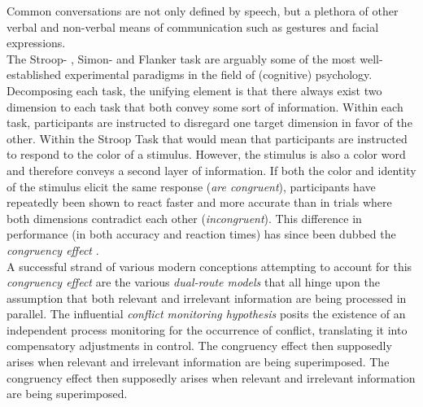 Common conversations are not only defined by speech, but a plethora of other
verbal and non-verbal means of communication such as gestures and facial
expressions.\\
The Stroop- \parencite[][]{stroop_studies_1935}, Simon- \parencite[][]{simon_auditory_1967}
and Flanker task \parencite[][]{eriksen_effects_1974} are arguably some of the
most well-established experimental paradigms in the field of (cognitive)
psychology. Decomposing each task, the unifying element is that there always
exist two dimension to each task that both convey some sort of information.
Within each task, participants are instructed to disregard one target
dimension in favor of the other. Within the Stroop Task that would mean that
participants are instructed to respond to the color of a stimulus. However,
the stimulus is also a color word and therefore conveys a second layer of
information. If both the color and identity of the stimulus elicit the same
response (\textit{are congruent}), participants have repeatedly been shown to
react faster and more accurate than in trials where both dimensions contradict
each other (\textit{incongruent}). This difference in performance (in both
accuracy and reaction times) has since been dubbed the \textit{congruency
	effect} \parencite[][]{botvinick_conflict_2001, botvinick_conflict_2004,
	stroop_studies_1935, simon_auditory_1967, eriksen_effects_1974}.\\
A successful strand of various modern conceptions attempting to account for this
\textit{congruency effect} are the various \textit{dual-route models}
\parencite[e.g.,][]{de_jong_conditional_1994, ridderinkhof_micro-_2002,
	botvinick_conflict_2001, botvinick_conflict_2004} that all hinge upon the
assumption that both relevant and irrelevant information are being processed
in parallel. The influential \textit{conflict monitoring hypothesis}
\parencite[][]{botvinick_conflict_2001} posits the existence of an
independent process monitoring for the occurrence of conflict, translating
it into compensatory adjustments in control. The congruency effect then
supposedly arises when relevant and irrelevant information are being
superimposed. The congruency effect then supposedly arises when relevant and
irrelevant information are being superimposed.\\
